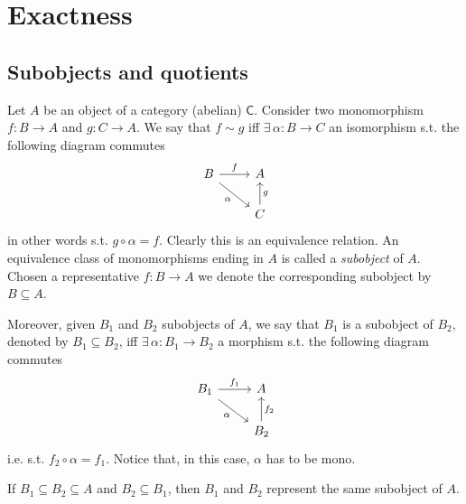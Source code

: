 \section{Exactness}
\subsection{Subobjects and quotients}
\begin{defn}[Subobject]
	Let $A$ be an object of a category (abelian) $\mathsf{C}$.
	Consider two monomorphism $f: B \to A$ and $g: C \to A$.
	We say that $f \sim g$ iff 
	$\exists\, \alpha: B \to C$ an isomorphism s.t. the following diagram commutes
	\begin{equation}
	\begin{tikzcd}
		B \arrow[r, "f", rightarrow] \arrow[rd, "\alpha"', rightarrow] &
		A\\
		&
		C \arrow[u, "g"', rightarrow] 
	\end{tikzcd}
	\end{equation} 
	in other words s.t. $g \circ \alpha = f$.
	Clearly this is an equivalence relation.
	An equivalence class of monomorphisms ending in $A$ is called a {\em subobject} of $A$.
	Chosen a representative $f: B \to A$ we denote the corresponding subobject by $B \subseteq A$.

	Moreover, given $B_1$ and $B_2$ subobjects of $A$, we say that $B_1$ is a subobject of $B_2$, 
	denoted by $B_1 \subseteq B_2$, iff
	$\exists\, \alpha: B_1 \to B_2$ a morphism s.t. the following diagram commutes
	\begin{equation}
	\begin{tikzcd}
		B_1 \arrow[r, "f_1", rightarrow] \arrow[rd, "\alpha"', rightarrow] &
		A\\
		&
		B_2 \arrow[u, "f_2"', rightarrow] 
	\end{tikzcd}
	\end{equation} 
	i.e. s.t. $f_2 \circ \alpha = f_1$.
	Notice that, in this case, $\alpha$ has to be mono.
\end{defn}

\begin{rem}
	If $B_1 \subseteq B_2 \subseteq A$ and $B_2 \subseteq B_1$, then $B_1$ and $B_2$ represent the same subobject of $A$.
\end{rem}

